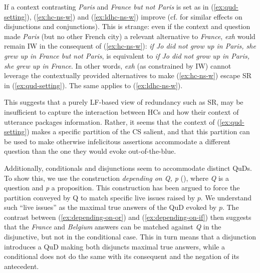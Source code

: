 If a context contrasting \textit{Paris} and \textit{France but not Paris} is set as in (\ref{ex:qud-setting}), (\ref{ex:hc-ns-w}) and (\ref{ex:ldhc-ns-w}) improve (cf. \cite{Haslinger2023} for similar effects on disjunctions and conjunctions). This is strange: even if the context and question made \textit{Paris} (but no other French city) a relevant alternative to \textit{France}, \textit{exh} would remain IW in the consequent of (\ref{ex:hc-ns-w}): \textit{if Jo did not grow up in Paris, she grew up in France but not Paris}, is equivalent to \textit{if Jo did not grow up in Paris, she grew up in France}. In other words, \textit{exh} (as constrained by IW) cannot leverage the contextually provided alternatives to make (\ref{ex:hc-ns-w}) escape SR in (\ref{ex:qud-setting}). The same applies to (\ref{ex:ldhc-ns-w}).


\begin{exe}
	\label{ex:qud-setting}
\end{exe}


This suggests that a purely LF-based view of redundancy such as SR, may be insufficient to capture the interaction between HCs and how their context of utterance packages information. Rather, it seems that the context of (\ref{ex:qud-setting}) makes a specific partition of the CS salient, and that this partition can be used to make otherwise infelicitous assertions accommodate a different question than the one they would evoke out-of-the-blue.

Additionally, conditionals and disjunctions seem to accommodate distinct QuDs. To show this, we use the construction \textit{depending on Q, p} (\cite{Karttunen1977,Kaufmann2016}), where \textit{Q} is a question and \textit{p} a proposition. This construction has been argued to force the partition conveyed by Q to match specific live issues raised by $p$. We understand such ``live issues'' as the maximal true answers of the QuD evoked by $p$. The contrast between (\ref{ex:depending-on-or}) and (\ref{ex:depending-on-if}) then suggests that the \textit{France} and \textit{Belgium} answers can be matched against \textit{Q} in the disjunctive, but not in the conditional case. This in turn means that a disjunction introduces a QuD making both disjuncts maximal true answers, while a conditional does not do the same with its consequent and the negation of its antecedent.

